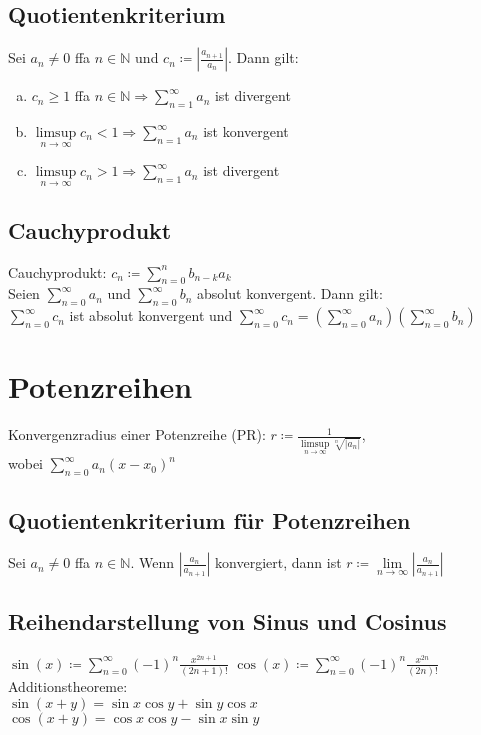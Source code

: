 \documentclass{article}
\begin{document}
\subsection{Quotientenkriterium}
Sei $a_n \neq 0$ ffa $n \in \mathbb{N}$ und $c_n \coloneqq |\frac{a_{n+1}}{a_n}|$. Dann gilt:
\begin{enumerate}[a)]
    \item $c_n \geq 1$ ffa $n \in \mathbb{N} \Rightarrow \sum \limits_{n=1}^{\infty} a_n$ ist divergent
    \item $\limsup \limits_{n \to \infty} c_n < 1 \Rightarrow \sum \limits_{n=1}^{\infty} a_n$ ist konvergent
    \item $\limsup \limits_{n \to \infty} c_n > 1 \Rightarrow \sum \limits_{n=1}^{\infty} a_n$ ist divergent
\end{enumerate}

\subsection{Cauchyprodukt}
Cauchyprodukt: $c_n \coloneqq \sum \limits_{n=0}^{n}b_{n-k}a_k$ \\
Seien $\sum \limits_{n=0}^{\infty} a_n$ und $\sum \limits_{n=0}^{\infty} b_n$ absolut konvergent. Dann gilt: \\
$\sum \limits_{n=0}^{\infty} c_n$ ist absolut konvergent und $\sum \limits_{n=0}^{\infty} c_n = (\sum \limits_{n=0}^{\infty} a_n) (\sum \limits_{n=0}^{\infty} b_n)$

\section{Potenzreihen}
Konvergenzradius einer Potenzreihe (PR): $r \coloneqq \frac{1}{\limsup \limits_{n \to \infty} \sqrt[n]{|a_n|}}$, \\
wobei $\sum \limits_{n=0}^{\infty} a_n (x-x_0)^n$

\subsection{Quotientenkriterium für Potenzreihen}
Sei $a_n \neq 0$ ffa $n \in \mathbb{N}$. Wenn $|\frac{a_n}{a_{n+1}}|$ konvergiert, dann ist $r \coloneqq \lim \limits_{n \to \infty} |\frac{a_n}{a_{n+1}}|$

\subsection{Reihendarstellung von Sinus und Cosinus}
$\sin(x) \coloneqq \sum \limits_{n=0}^{\infty} (-1)^n \frac{x^{2n+1}}{(2n+1)!}$ \hspace{3em} $\cos(x) \coloneqq \sum \limits_{n=0}^{\infty} (-1)^n \frac{x^{2n}}{(2n)!}$ \\
Additionstheoreme: \\
$\sin(x+y) = \sin x \cos y + \sin y \cos x$ \\
$\cos(x+y) = \cos x \cos y - \sin x \sin y$
\end{document}
